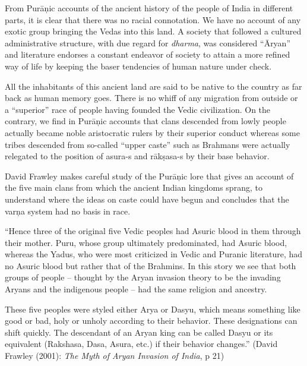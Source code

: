 From Purāņic accounts of the ancient history of the people of India in different parts, it is clear that there was no racial connotation. We have no account of any exotic group bringing the Vedas into this land. A society that followed a cultured administrative structure, with due regard for \textit{dharma}, was considered “Āryan” and literature endorses a constant endeavor of society to attain a more refined way of life by keeping the baser tendencies of human nature under check.

All the inhabitants of this ancient land are said to be native to the country as far back as human memory goes. There is no whiff of any migration from outside or a “superior” race of people having founded the Vedic civilization. On the contrary, we find in Purāņic accounts that clans descended from lowly people actually became noble aristocratic rulers by their superior conduct whereas some tribes descended from so-called “upper caste” such as Brahmans were actually relegated to the position of asura-s and rākṣasa-s by their base behavior.

David Frawley makes careful study of the Purāņic lore that gives an account of the five main clans from which the ancient Indian kingdoms sprang, to understand where the ideas on caste could have begun and concludes that the varņa system had no basis in race.

\begin{myquote}
“Hence three of the original five Vedic peoples had Asuric blood in them through their mother. Puru, whose group ultimately predominated, had Asuric blood, whereas the Yadus, who were most criticized in Vedic and Puranic literature, had no Asuric blood but rather that of the Brahmins. In this story we see that both groups of people – thought by the Aryan invasion theory to be the invading Aryans and the indigenous people – had the same religion and ancestry.
\end{myquote}

\begin{myquote}
These five peoples were styled either Arya or Dasyu, which means something like good or bad, holy or unholy according to their behavior. These designations can shift quickly. The descendant of an Aryan king can be called Dasyu or its equivalent (Rakshasa, Dasa, Asura, etc.) if their behavior changes.” (David Frawley (2001): \textit{The Myth of Aryan Invasion of India}, p 21)
\end{myquote}

